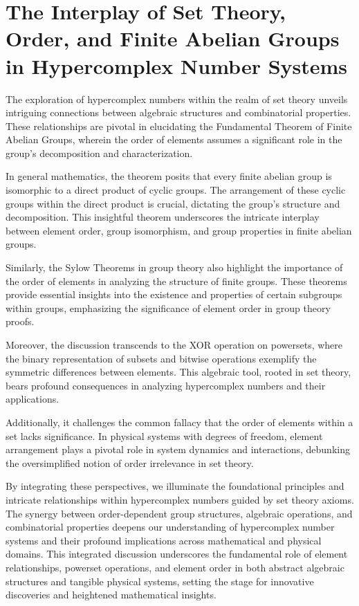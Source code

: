 \documentclass{article}
\begin{document}
\section{The Interplay of Set Theory, Order, and Finite Abelian Groups in Hypercomplex Number Systems}

The exploration of hypercomplex numbers within the realm of set theory unveils intriguing connections between algebraic structures and combinatorial properties. These relationships are pivotal in elucidating the Fundamental Theorem of Finite Abelian Groups, wherein the order of elements assumes a significant role in the group's decomposition and characterization.

In general mathematics, the theorem posits that every finite abelian group is isomorphic to a direct product of cyclic groups. The arrangement of these cyclic groups within the direct product is crucial, dictating the group's structure and decomposition. This insightful theorem underscores the intricate interplay between element order, group isomorphism, and group properties in finite abelian groups.

Similarly, the Sylow Theorems in group theory also highlight the importance of the order of elements in analyzing the structure of finite groups. These theorems provide essential insights into the existence and properties of certain subgroups within groups, emphasizing the significance of element order in group theory proofs.

Moreover, the discussion transcends to the XOR operation on powersets, where the binary representation of subsets and bitwise operations exemplify the symmetric differences between elements. This algebraic tool, rooted in set theory, bears profound consequences in analyzing hypercomplex numbers and their applications.

Additionally, it challenges the common fallacy that the order of elements within a set lacks significance. In physical systems with degrees of freedom, element arrangement plays a pivotal role in system dynamics and interactions, debunking the oversimplified notion of order irrelevance in set theory.

By integrating these perspectives, we illuminate the foundational principles and intricate relationships within hypercomplex numbers guided by set theory axioms. The synergy between order-dependent group structures, algebraic operations, and combinatorial properties deepens our understanding of hypercomplex number systems and their profound implications across mathematical and physical domains. This integrated discussion underscores the fundamental role of element relationships, powerset operations, and element order in both abstract algebraic structures and tangible physical systems, setting the stage for innovative discoveries and heightened mathematical insights.
\end{document}
